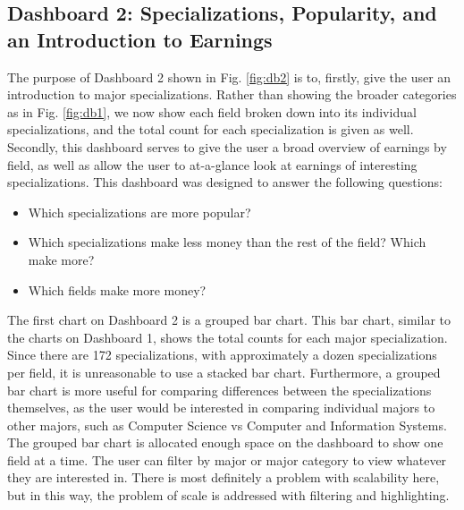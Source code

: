 \documentclass[sigchi]{acmart}
\begin{document}
\subsection{Dashboard 2: Specializations, Popularity, and an Introduction to Earnings}
\label{sec:db2}

The purpose of Dashboard 2 shown in Fig. \ref{fig:db2} is to, firstly, give the user an introduction to major specializations. Rather than showing the broader categories as in Fig. \ref{fig:db1}, we now show each field broken down into its individual specializations, and the total count for each specialization is given as well. Secondly, this dashboard serves to give the user a broad overview of earnings by field, as well as allow the user to at-a-glance look at earnings of interesting specializations. This dashboard was designed to answer the following questions: 
\begin{itemize}
\item{Which specializations are more popular?}
\item{Which specializations make less money than the rest of the field?  Which make more?}
\item{Which fields make more money?}
\end{itemize}

The first chart on Dashboard 2 is a grouped bar chart. This bar chart, similar to the charts on Dashboard 1, shows the total counts for each major specialization. Since there are 172 specializations, with approximately a dozen specializations per field, it is unreasonable to use a stacked bar chart. Furthermore, a grouped bar chart is more useful for comparing differences between the specializations themselves, as the user would be interested in comparing individual majors to other majors, such as Computer Science vs Computer and Information Systems. The grouped bar chart is allocated enough space on the dashboard to show one field at a time. The user can filter by major or major category to view whatever they are interested in. There is most definitely a problem with scalability here, but in this way, the problem of scale is addressed with filtering and highlighting. 
\end{document}
